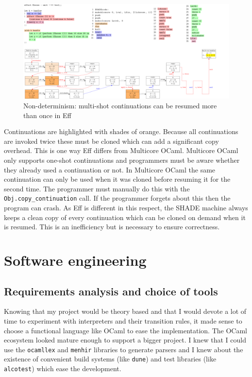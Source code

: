 \documentclass[class=article, crop=false]{standalone}
\begin{document}
\begin{landscape}
\begin{figure}[htb]
    \centering
    \includegraphics[width=\paperwidth]{../figures/impl-two-resume.pdf}
    \caption[Implementation of multi-shot continuations]{Non-determinism: multi-shot continuations can be resumed more than once in Eff}
    \label{fig:shadecode-two-resume}
\end{figure}

Continuations are highlighted with shades of orange. Because all continuations
are invoked twice these must be cloned which can add a significant copy overhead.
This is one way Eff differs from Multicore OCaml. Multicore OCaml only supports
one-shot continuations and programmers must be aware whether they already used
a continuation or not. In Multicore OCaml the same continuation can only be used
when it was cloned before resuming it for the second time. The programmer must
manually do this with the \lstinline|Obj.copy_continuation| call. If the
programmer forgets about this then the program can crash. As Eff is different
in this respect, the SHADE machine always keeps a clean copy of every
continuation which can be cloned on demand when it is resumed.
This is an inefficiency but is necessary to ensure correctness.

\end{landscape}

\section{Software engineering}

\subsection{Requirements analysis and choice of tools}

Knowing that my project would be theory based and that I would devote a lot of
time to experiment with interpreters and their transition rules, it made sense
to choose a functional language like OCaml to ease the implementation.
The OCaml ecosystem looked mature enough to support a bigger project. I knew
that I could use the \lstinline|ocamllex| and \lstinline|menhir| libraries to
generate parsers and I knew about the existence of convenient build systems
(like \lstinline|dune|) and test libraries (like \lstinline|alcotest|)
which ease the development.
\end{document}
